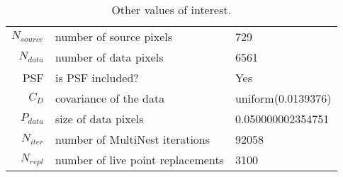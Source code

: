 \begin{table*}[!htb]\caption{Other values of interest.}\begin{center}\begin{tabular}{ r l l }\hline $N_{source}$ & number of source pixels           & 729 \\ 
 $N_{data}$   & number of data pixels             & 6561 \\ 
 PSF & is PSF included?                          & Yes \\
 $C_D$        & covariance of the data            & uniform(0.0139376) \\ 
 $P_{data}$   & size of data pixels               & 0.050000002354751 \\ 
 $N_{iter}$   & number of MultiNest iterations    & 92058 \\ 
 $N_{repl}$   & number of live point replacements & 3100 \\ 
\hline\end{tabular}\end{center}\label{tab:3}\end{table*}